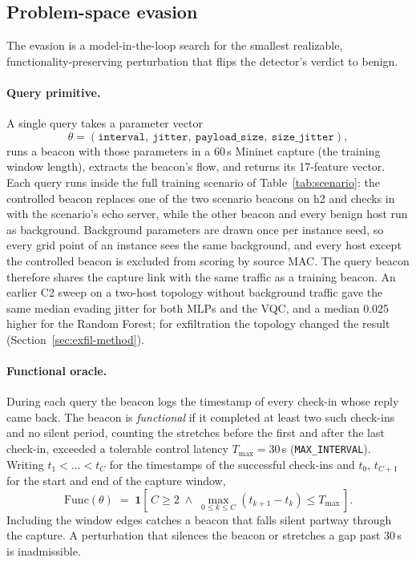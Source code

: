 \documentclass[preprint,12pt]{elsarticle}
\begin{document}
\subsection{Problem-space evasion}
\label{sec:evasion}
The evasion is a model-in-the-loop search for the smallest realizable, functionality-preserving
perturbation that flips the detector's verdict to benign.

\paragraph{Query primitive.} A single query takes a parameter vector
\[
\theta = (\texttt{interval},\ \texttt{jitter},\ \texttt{payload\_size},\ \texttt{size\_jitter}),
\]
runs a beacon with those parameters in a 60\,s Mininet capture (the training window length), extracts
the beacon's flow, and returns its 17-feature vector. Each query runs inside the full training scenario
of Table~\ref{tab:scenario}: the controlled beacon replaces one of the two scenario beacons on h2 and
checks in with the scenario's echo server, while the other beacon and every benign host run as
background. Background parameters are drawn once per instance seed, so every grid point of an instance
sees the same background, and every host except the controlled beacon is excluded from scoring by
source MAC. The query beacon therefore shares the capture link with the same traffic as a training
beacon. An earlier C2 sweep on a two-host topology without background traffic gave the same median
evading jitter for both MLPs and the VQC, and a median 0.025 higher for the Random Forest; for
exfiltration the topology changed the result (Section~\ref{sec:exfil-method}).

\paragraph{Functional oracle.} During each query the beacon logs the timestamp of every check-in whose
reply came back. The beacon is \emph{functional} if it completed at least two such check-ins and no
silent period, counting the stretches before the first and after the last check-in, exceeded a
tolerable control latency $T_{\max}=30$\,s (\texttt{MAX\_INTERVAL}). Writing $t_1<\dots<t_C$ for the
timestamps of the successful check-ins and $t_0$, $t_{C+1}$ for the start and end of the capture window,
\begin{equation}
\mathrm{Func}(\theta) \;=\; \mathbf{1}\!\left[\,C \ge 2 \;\wedge\; \max_{0\le k\le C}(t_{k+1}-t_k) \le T_{\max}\,\right].
\label{eq:oracle}
\end{equation}
Including the window edges catches a beacon that falls silent partway through the capture. A
perturbation that silences the beacon or stretches a gap past 30\,s is inadmissible.
\end{document}
